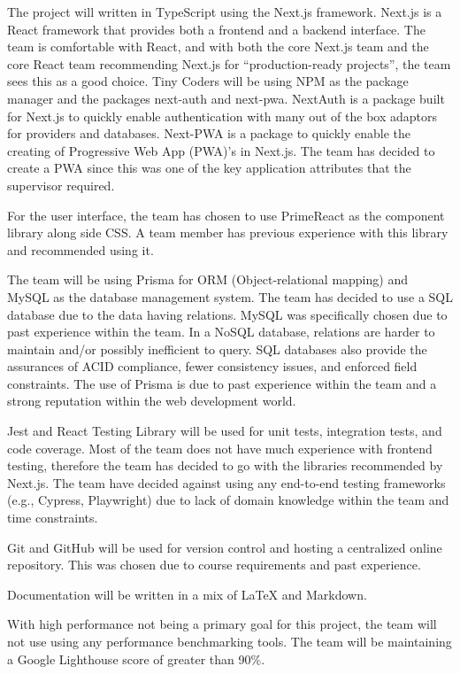 \documentclass{article}
\begin{document}
The project will written in TypeScript using the Next.js framework. Next.js is a React framework
that provides both a frontend and a backend interface. The team is comfortable with React, and with
both the core Next.js team and the core React team recommending Next.js for ``production-ready
projects'', the team sees this as a good choice. Tiny Coders will be using NPM as the package
manager and the packages next-auth and next-pwa. NextAuth is a package built for Next.js to quickly
enable authentication with many out of the box adaptors for providers and databases. Next-PWA is a
package to quickly enable the creating of Progressive Web App (PWA)'s in Next.js. The team has
decided to create a PWA since this was one of the key application attributes that the supervisor
required.

For the user interface, the team has chosen to use PrimeReact as the component library along side
CSS. A team member has previous experience with this library and recommended using it.

The team will be using Prisma for ORM (Object-relational mapping) and MySQL as the database
management system. The team has decided to use a SQL database due to the data having relations.
MySQL was specifically chosen due to past experience within the team. In a NoSQL database,
relations are harder to maintain and/or possibly inefficient to query. SQL databases also provide
the assurances of ACID compliance, fewer consistency issues, and enforced field constraints. The
use of Prisma is due to past experience within the team and a strong reputation within the web
development world.

Jest and React Testing Library will be used for unit tests, integration tests, and code coverage.
Most of the team does not have much experience with frontend testing, therefore the team has
decided to go with the libraries recommended by Next.js. The team have decided against using any
end-to-end testing frameworks (e.g., Cypress, Playwright) due to lack of domain knowledge within
the team and time constraints.

Git and GitHub will be used for version control and hosting a centralized online repository. This
was chosen due to course requirements and past experience.

Documentation will be written in a mix of \LaTeX{} and Markdown.

With high performance not being a primary goal for this project, the team will not use using any
performance benchmarking tools. The team will be maintaining a Google Lighthouse score of greater
than 90\%.
\end{document}
